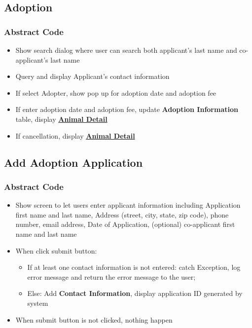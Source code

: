 \documentclass[a4paper]{article}
\begin{document}
\hypertarget{adoption}{\subsection{Adoption}}

\subsubsection*{Abstract Code}

\begin{itemize}
	\item Show search dialog where user can search both applicant's last name and co-applicant's last name
	\item Query and display Applicant's contact information
	\item If select Adopter, show pop up for adoption date and adoption fee
	\item If enter adoption date and adoption fee, update \textbf{Adoption Information}  table, display  \underline{\textbf{Animal Detail}}
	\item If cancellation, display  \underline{\textbf{Animal Detail}}
\end{itemize}


\hypertarget{add_adoption_app}{\subsection{Add Adoption Application}}

\subsubsection*{Abstract Code}

\begin{itemize}
	\item Show screen to let users enter applicant information including Application first name and last name, Address (street, city, state, zip code), phone number, email address, Date of Application, (optional) co-applicant first name and last name
	\item When click submit button:
	\begin{itemize}
	    \item If at least one contact information is not entered: catch Exception, log error message and return the error message to the user;
	    \item Else: Add \textbf{Contact Information}, display application ID generated by system
	\end{itemize}
	\item When submit button is not clicked, nothing happen

\end{itemize}
\end{document}
